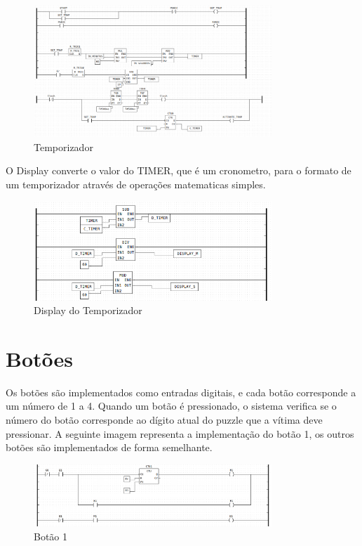 \begin{figure}[H]
    \centering
    \includegraphics[width=0.8\textwidth]{images/sub_timer.png}
    \caption{Temporizador}
    \label{fig:temporizador}
\end{figure}

O Display converte o valor do TIMER, que é um cronometro, para o formato de um temporizador através de operações matematicas simples.

\begin{figure}[H]
    \centering
    \includegraphics[width=0.8\textwidth]{images/display.png}
    \caption{Display do Temporizador}
    \label{fig:display_do_temporizador}
\end{figure}


\section{Botões}
Os botões são implementados como entradas digitais, e cada botão corresponde a um número de 1 a 4. Quando um botão é pressionado, o sistema verifica se o número do botão corresponde ao dígito atual do puzzle que a vítima deve pressionar. 
A seguinte imagem representa a implementação do botão 1, os outros botões são implementados de forma semelhante.

\begin{figure}[H]
    \centering
    \includegraphics[width=0.8\textwidth]{images/button_input.png}
    \caption{Botão 1}
    \label{fig:botao_1}
\end{figure}

